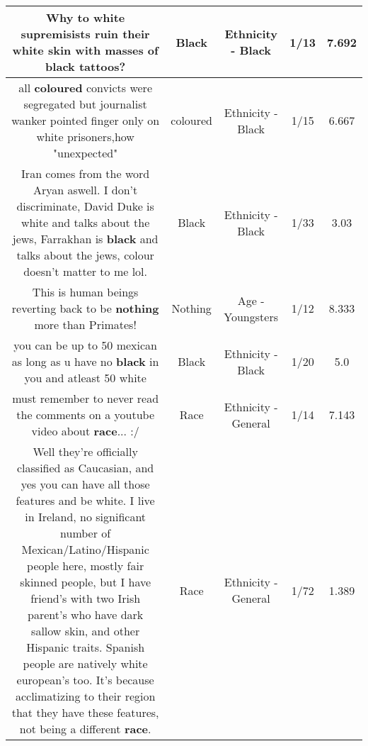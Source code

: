 \documentclass[11pt]{article}
\newlength\mylength
\begin{document}
\begin{center}
\begin{longtable}{|C{.65\mylength}|C{.30\mylength}|C{.12\mylength}|C{.12\mylength}|C{.12\mylength}|}
  \small Why to white supremisists ruin their white skin with masses of \textbf{black} tattoos?\normalsize   & Black & Ethnicity - Black & 1/13 & 7.692 \\  \hline
  \small all \textbf{coloured} convicts were segregated but journalist wanker pointed finger only on white prisoners,how "unexpected"\normalsize   & coloured & Ethnicity - Black & 1/15 & 6.667 \\  \hline
  \small Iran comes from the word Aryan aswell. I don't discriminate, David Duke is white and talks about the jews, Farrakhan is \textbf{black} and talks about the jews, colour doesn't matter to me lol.\normalsize   & Black & Ethnicity - Black & 1/33 & 3.03 \\  \hline
  \small This is human beings reverting back to be \textbf{nothing} more than Primates!\normalsize   & Nothing & Age - Youngsters & 1/12 & 8.333 \\  \hline
  \small you can be up to 50 mexican as long as u have no \textbf{black} in you and atleast 50 white\normalsize   & Black & Ethnicity - Black & 1/20 & 5.0 \\  \hline
  \small must remember to never read the comments on a youtube video about \textbf{race}...  :/\normalsize   & Race & Ethnicity - General & 1/14 & 7.143 \\  \hline
  \small Well they're officially classified as Caucasian, and yes you can have all those features and be white. I live in Ireland, no significant number of Mexican/Latino/Hispanic people here, mostly fair skinned people, but I have friend's with two Irish parent's who have dark sallow skin, and other Hispanic traits. Spanish people are natively white european's too. It's because acclimatizing to their region that they have these features, not being a different \textbf{race}.\normalsize   & Race & Ethnicity - General & 1/72 & 1.389 \\  \hline

\end{longtable}
\end{center}
\end{document}
